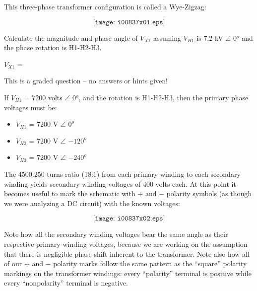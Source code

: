 

This three-phase transformer configuration is called a Wye-Zigzag:

$$\texttt{[image: i00837x01.eps]}$$

Calculate the magnitude and phase angle of $V_{X1}$ assuming $V_{H1}$ is 7.2 kV $\angle$ 0$^{o}$ and the phase rotation is H1-H2-H3.

\vskip 10pt

$V_{X1}$ = \underbar{\hskip 50pt}

\vfil 

\eject






This is a graded question -- no answers or hints given!







If $V_{H1}$ = 7200 volts $\angle$ 0$^{o}$, and the rotation is H1-H2-H3, then the primary phase voltages must be:

\begin{itemize}
\item{} $V_{H1}$ = 7200 V $\angle$ $0^{o}$
\item{} $V_{H2}$ = 7200 V $\angle$ $-120^{o}$
\item{} $V_{H3}$ = 7200 V $\angle$ $-240^{o}$
\end{itemize}

The 4500:250 turns ratio (18:1) from each primary winding to each secondary winding yields secondary winding voltages of 400 volts each.  At this point it becomes useful to mark the schematic with + and $-$ polarity symbols (as though we were analyzing a DC circuit) with the known voltages:

$$\texttt{[image: i00837x02.eps]}$$

Note how all the secondary winding voltages bear the same angle as their respective primary winding voltages, because we are working on the assumption that there is negligible phase shift inherent to the transformer.  Note also how all of our + and $-$ polarity marks follow the same pattern as the ``square'' polarity markings on the transformer windings: every ``polarity'' terminal is positive while every ``nonpolarity'' terminal is negative.

